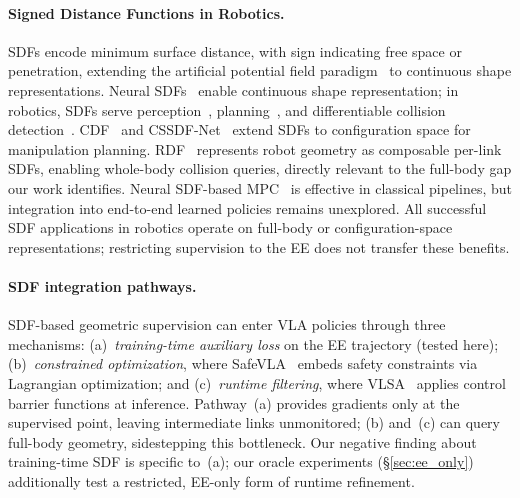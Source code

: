 \paragraph{Signed Distance Functions in Robotics.}
SDFs encode minimum surface distance, with sign indicating free space or penetration, extending the artificial potential field paradigm~\cite{khatib1986potential} to continuous shape representations. Neural SDFs~\cite{park2019deepsdf} enable continuous shape representation; in robotics, SDFs serve perception~\cite{ortiz2022isdf}, planning~\cite{vasilopoulos2023ramp}, and differentiable collision detection~\cite{zhi2021diffco}. CDF~\cite{li2024cdf} and CSSDF-Net~\cite{chen2026cssdfnet} extend SDFs to configuration space for manipulation planning. RDF~\cite{li2024rdf} represents robot geometry as composable per-link SDFs, enabling whole-body collision queries, directly relevant to the full-body gap our work identifies. Neural SDF-based MPC~\cite{jacquet2025neuralnmpc} is effective in classical pipelines, but integration into end-to-end learned policies remains unexplored. All successful SDF applications in robotics operate on full-body or configuration-space representations; restricting supervision to the EE does not transfer these benefits.

\paragraph{SDF integration pathways.} SDF-based geometric supervision can enter VLA policies through three mechanisms: (a)~\emph{training-time auxiliary loss} on the EE trajectory (tested here); (b)~\emph{constrained optimization}, where SafeVLA~\cite{zhang2025safevla} embeds safety constraints via Lagrangian optimization; and (c)~\emph{runtime filtering}, where VLSA~\cite{hu2025vlsa} applies control barrier functions at inference. Pathway~(a) provides gradients only at the supervised point, leaving intermediate links unmonitored; (b) and~(c) can query full-body geometry, sidestepping this bottleneck. Our negative finding about training-time SDF is specific to~(a); our oracle experiments (\S\ref{sec:ee_only}) additionally test a restricted, EE-only form of runtime refinement.

